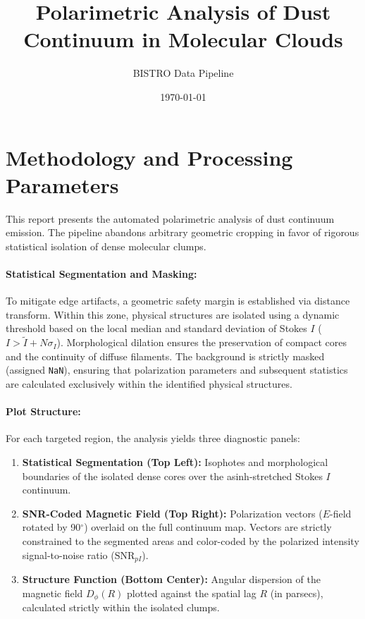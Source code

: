 \documentclass[10pt, a4paper]{article}
\title{Polarimetric Analysis of Dust Continuum in Molecular Clouds}
\author{BISTRO Data Pipeline}
\date{\today}
\begin{document}
\maketitle

\section*{Methodology and Processing Parameters}

This report presents the automated polarimetric analysis of dust continuum emission. The pipeline abandons arbitrary geometric cropping in favor of rigorous statistical isolation of dense molecular clumps.

\paragraph{Statistical Segmentation and Masking:}
To mitigate edge artifacts, a geometric safety margin is established via distance transform. Within this zone, physical structures are isolated using a dynamic threshold based on the local median and standard deviation of Stokes $I$ ($I > \tilde{I} + N\sigma_I$). Morphological dilation ensures the preservation of compact cores and the continuity of diffuse filaments. The background is strictly masked (assigned \texttt{NaN}), ensuring that polarization parameters and subsequent statistics are calculated exclusively within the identified physical structures.

\paragraph{Plot Structure:}
For each targeted region, the analysis yields three diagnostic panels:
\begin{enumerate}
    \item \textbf{Statistical Segmentation (Top Left):} Isophotes and morphological boundaries of the isolated dense cores over the asinh-stretched Stokes $I$ continuum.
    \item \textbf{SNR-Coded Magnetic Field (Top Right):} Polarization vectors ($E$-field rotated by 90$^\circ$) overlaid on the full continuum map. Vectors are strictly constrained to the segmented areas and color-coded by the polarized intensity signal-to-noise ratio ($\text{SNR}_{pI}$).
    \item \textbf{Structure Function (Bottom Center):} Angular dispersion of the magnetic field $D_\phi(R)$ plotted against the spatial lag $R$ (in parsecs), calculated strictly within the isolated clumps.
\end{enumerate}
\end{document}
